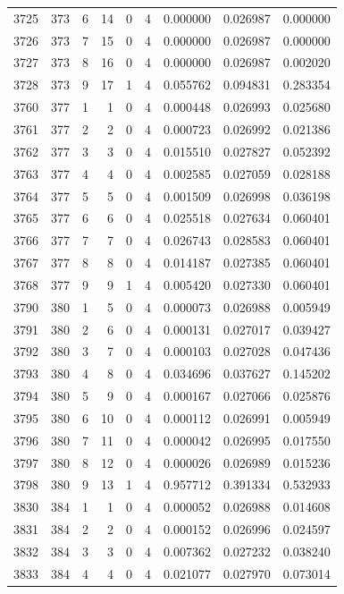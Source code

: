 \begin{longtable}{rrrrrrrrr}
3725 & 373 & 6 & 14 & 0 & 4 & 0.000000 & 0.026987 & 0.000000 \\
3726 & 373 & 7 & 15 & 0 & 4 & 0.000000 & 0.026987 & 0.000000 \\
3727 & 373 & 8 & 16 & 0 & 4 & 0.000000 & 0.026987 & 0.002020 \\
3728 & 373 & 9 & 17 & 1 & 4 & 0.055762 & 0.094831 & 0.283354 \\
3760 & 377 & 1 & 1 & 0 & 4 & 0.000448 & 0.026993 & 0.025680 \\
3761 & 377 & 2 & 2 & 0 & 4 & 0.000723 & 0.026992 & 0.021386 \\
3762 & 377 & 3 & 3 & 0 & 4 & 0.015510 & 0.027827 & 0.052392 \\
3763 & 377 & 4 & 4 & 0 & 4 & 0.002585 & 0.027059 & 0.028188 \\
3764 & 377 & 5 & 5 & 0 & 4 & 0.001509 & 0.026998 & 0.036198 \\
3765 & 377 & 6 & 6 & 0 & 4 & 0.025518 & 0.027634 & 0.060401 \\
3766 & 377 & 7 & 7 & 0 & 4 & 0.026743 & 0.028583 & 0.060401 \\
3767 & 377 & 8 & 8 & 0 & 4 & 0.014187 & 0.027385 & 0.060401 \\
3768 & 377 & 9 & 9 & 1 & 4 & 0.005420 & 0.027330 & 0.060401 \\
3790 & 380 & 1 & 5 & 0 & 4 & 0.000073 & 0.026988 & 0.005949 \\
3791 & 380 & 2 & 6 & 0 & 4 & 0.000131 & 0.027017 & 0.039427 \\
3792 & 380 & 3 & 7 & 0 & 4 & 0.000103 & 0.027028 & 0.047436 \\
3793 & 380 & 4 & 8 & 0 & 4 & 0.034696 & 0.037627 & 0.145202 \\
3794 & 380 & 5 & 9 & 0 & 4 & 0.000167 & 0.027066 & 0.025876 \\
3795 & 380 & 6 & 10 & 0 & 4 & 0.000112 & 0.026991 & 0.005949 \\
3796 & 380 & 7 & 11 & 0 & 4 & 0.000042 & 0.026995 & 0.017550 \\
3797 & 380 & 8 & 12 & 0 & 4 & 0.000026 & 0.026989 & 0.015236 \\
3798 & 380 & 9 & 13 & 1 & 4 & 0.957712 & 0.391334 & 0.532933 \\
3830 & 384 & 1 & 1 & 0 & 4 & 0.000052 & 0.026988 & 0.014608 \\
3831 & 384 & 2 & 2 & 0 & 4 & 0.000152 & 0.026996 & 0.024597 \\
3832 & 384 & 3 & 3 & 0 & 4 & 0.007362 & 0.027232 & 0.038240 \\
3833 & 384 & 4 & 4 & 0 & 4 & 0.021077 & 0.027970 & 0.073014 \\

\end{longtable}
